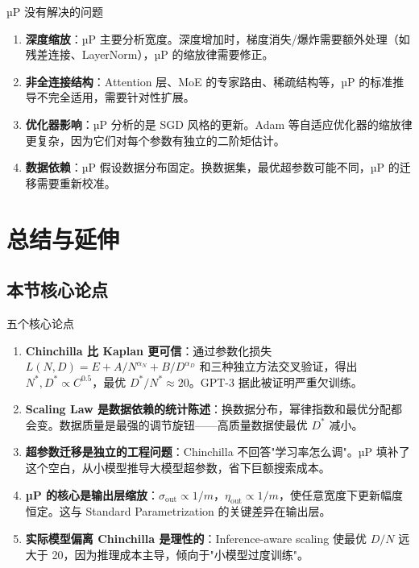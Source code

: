 \documentclass[a4paper]{article}
\begin{document}
\begin{warningbox}{µP 没有解决的问题}
\begin{enumerate}
\item \textbf{深度缩放}：µP 主要分析宽度。深度增加时，梯度消失/爆炸需要额外处理（如残差连接、LayerNorm），µP 的缩放律需要修正。
\item \textbf{非全连接结构}：Attention 层、MoE 的专家路由、稀疏结构等，µP 的标准推导不完全适用，需要针对性扩展。
\item \textbf{优化器影响}：µP 分析的是 SGD 风格的更新。Adam 等自适应优化器的缩放律更复杂，因为它们对每个参数有独立的二阶矩估计。
\item \textbf{数据依赖}：µP 假设数据分布固定。换数据集，最优超参数可能不同，µP 的迁移需要重新校准。
\end{enumerate}
\end{warningbox}

\section{总结与延伸}

\subsection{本节核心论点}

\begin{importantbox}{五个核心论点}
\begin{enumerate}
\item \textbf{Chinchilla 比 Kaplan 更可信}：通过参数化损失 $L(N,D) = E + A/N^{\alpha_N} + B/D^{\alpha_D}$ 和三种独立方法交叉验证，得出 $N^*, D^* \propto C^{0.5}$，最优 $D^*/N^* \approx 20$。GPT-3 据此被证明严重欠训练。
\item \textbf{Scaling Law 是数据依赖的统计陈述}：换数据分布，幂律指数和最优分配都会变。数据质量是最强的调节旋钮——高质量数据使最优 $D^*$ 减小。
\item \textbf{超参数迁移是独立的工程问题}：Chinchilla 不回答"学习率怎么调"。µP 填补了这个空白，从小模型推导大模型超参数，省下巨额搜索成本。
\item \textbf{µP 的核心是输出层缩放}：$\sigma_{\text{out}} \propto 1/m$，$\eta_{\text{out}} \propto 1/m$，使任意宽度下更新幅度恒定。这与 Standard Parametrization 的关键差异在输出层。
\item \textbf{实际模型偏离 Chinchilla 是理性的}：Inference-aware scaling 使最优 $D/N$ 远大于 20，因为推理成本主导，倾向于"小模型过度训练"。
\end{enumerate}
\end{importantbox}
\end{document}
